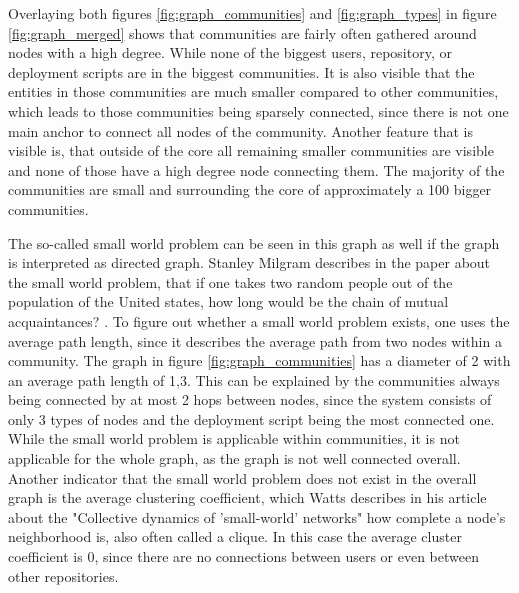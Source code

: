 Overlaying both figures \ref{fig:graph_communities} and \ref{fig:graph_types} in figure \ref{fig:graph_merged} shows that communities are fairly often gathered around nodes with a high degree. While none of the biggest users, repository, or deployment scripts are in the biggest communities. It is also visible that the entities in those communities are much smaller compared to other communities, which leads to those communities being sparsely connected, since there is not one main anchor to connect all nodes of the community. Another feature that is visible is, that outside of the core all remaining smaller communities are visible and none of those have a high degree node connecting them. The majority of the communities are small and surrounding the core of approximately a 100 bigger communities.

The so-called small world problem can be seen in this graph as well if the graph is interpreted as directed graph. Stanley Milgram describes in the paper about the small world problem, that if one takes two random people out of the population of the United states, how long would be the chain of mutual acquaintances? \cite{SmallWorld}. To figure out whether a small world problem exists, one uses the average path length, since it describes the average path from two nodes within a community. The graph in figure \ref{fig:graph_communities} has a diameter of 2 with an average path length of 1,3. This can be explained by the communities always being connected by at most 2 hops between nodes, since the system consists of only 3 types of nodes and the deployment script being the most connected one. While the small world problem is applicable within communities, it is not applicable for the whole graph, as the graph is not well connected overall. Another indicator that the small world problem does not exist in the overall graph is the average clustering coefficient, which Watts describes in his article about the "Collective dynamics of 'small-world' networks"\cite{Watts1998Collective} how complete a node's neighborhood is, also often called a clique. In this case the average cluster coefficient is 0, since there are no connections between users or even between other repositories.

